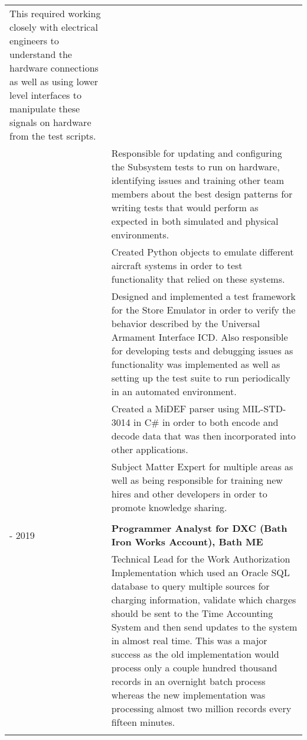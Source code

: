 \documentclass[11pt, letterpaper]{article}
\begin{document}
\begin{longtable}{p{1in}|p{6in}}
        This required working closely with electrical engineers to understand the hardware connections as well as using lower level interfaces to manipulate these signals on hardware from the test scripts.\vspace{0.2cm}\\&
        Responsible for updating and configuring the Subsystem tests to run on hardware, identifying issues and training other team members about the best design patterns for writing tests that would perform as expected in both simulated and physical environments.\vspace{0.2cm}\\&
        Created Python objects to emulate different aircraft systems in order to test functionality that relied on these systems.\vspace{0.2cm}\\&
        Designed and implemented a test framework for the Store Emulator in order to verify the behavior described by the Universal Armament Interface ICD. Also responsible for developing tests and debugging issues as functionality was implemented as well as setting up the test suite to run periodically in an automated environment.\vspace{0.2cm}\\&
        Created a MiDEF parser using MIL-STD-3014 in C\# in order to both encode and decode data that was then incorporated into other applications.\vspace{0.2cm}\\&
	    Subject Matter Expert for multiple areas as well as being responsible for training new hires and other developers in order to promote knowledge sharing.\\
    \multicolumn{2}{c}{}\\
	\centering 2015 - 2019 & \textbf{Programmer Analyst for DXC (Bath Iron Works Account), Bath ME}\vspace{0.1cm}\\&
        Technical Lead for the Work Authorization Implementation which used an Oracle SQL database to query multiple sources for charging information, validate which charges should be sent to the Time Accounting System and then send updates to the system in almost real time.
        This was a major success as the old implementation would process only a couple hundred thousand records in an overnight batch process whereas the new implementation was processing almost two million records every fifteen minutes.\vspace{0.2cm}\\&

\end{longtable}
\end{document}
